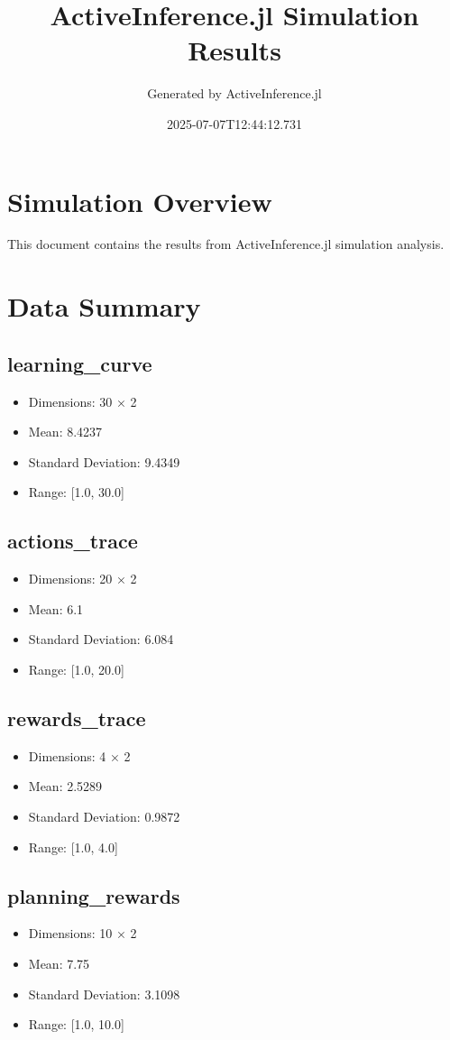 \documentclass{article}
\title{ActiveInference.jl Simulation Results}
\author{Generated by ActiveInference.jl}
\date{2025-07-07T12:44:12.731}
\begin{document}
\maketitle

\section{Simulation Overview}
This document contains the results from ActiveInference.jl simulation analysis.

\section{Data Summary}
\subsection{learning_curve}
\begin{itemize}
\item Dimensions: 30 × 2
\item Mean: 8.4237
\item Standard Deviation: 9.4349
\item Range: [1.0, 30.0]
\end{itemize}

\subsection{actions_trace}
\begin{itemize}
\item Dimensions: 20 × 2
\item Mean: 6.1
\item Standard Deviation: 6.084
\item Range: [1.0, 20.0]
\end{itemize}

\subsection{rewards_trace}
\begin{itemize}
\item Dimensions: 4 × 2
\item Mean: 2.5289
\item Standard Deviation: 0.9872
\item Range: [1.0, 4.0]
\end{itemize}

\subsection{planning_rewards}
\begin{itemize}
\item Dimensions: 10 × 2
\item Mean: 7.75
\item Standard Deviation: 3.1098
\item Range: [1.0, 10.0]
\end{itemize}
\end{document}
